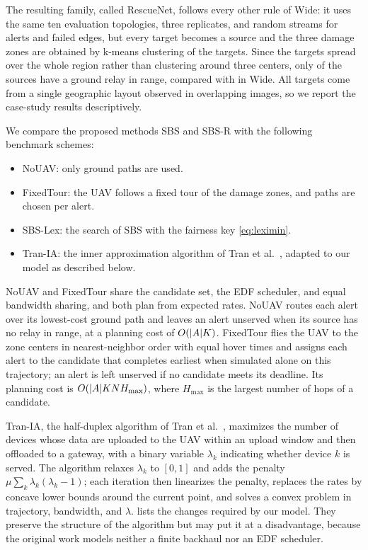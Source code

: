 The resulting family, called RescueNet, follows every other rule of Wide: it uses the same ten evaluation topologies, three replicates, and random streams for alerts and failed edges, but every target becomes a source and the three damage zones are obtained by k-means clustering of the targets. Since the targets spread over the whole region rather than clustering around three centers, only \ResultExtGroundFractionRescuenet{} of the sources have a ground relay in range, compared with \ResultExtGroundFractionVzero{} in Wide. All targets come from a single geographic layout observed in overlapping images, so we report the case-study results descriptively.

\label{sec:baselines}
We compare the proposed methods SBS and SBS-R with the following benchmark schemes:
\begin{itemize}
\item NoUAV: only ground paths are used.
\item FixedTour: the UAV follows a fixed tour of the damage zones, and paths are chosen per alert.
\item SBS-Lex: the search of SBS with the fairness key \eqref{eq:leximin}.
\item Tran-IA: the inner approximation algorithm of Tran et al.~\cite{tran2022relay}, adapted to our model as described below.
\end{itemize}
NoUAV and FixedTour share the candidate set, the EDF scheduler, and equal bandwidth sharing, and both plan from expected rates. NoUAV routes each alert over its lowest-cost ground path and leaves an alert unserved when its source has no relay in range, at a planning cost of $O(\lvert A\rvert K)$. FixedTour flies the UAV to the zone centers in nearest-neighbor order with equal hover times and assigns each alert to the candidate that completes earliest when simulated alone on this trajectory; an alert is left unserved if no candidate meets its deadline. Its planning cost is $O(\lvert A\rvert KNH_{\max})$, where $H_{\max}$ is the largest number of hops of a candidate.

\label{sec:tran}
Tran-IA, the half-duplex algorithm of Tran et al.~\cite{tran2022relay}, maximizes the number of devices whose data are uploaded to the UAV within an upload window and then offloaded to a gateway, with a binary variable $\lambda_k$ indicating whether device $k$ is served. The algorithm relaxes $\lambda_k$ to $[0,1]$ and adds the penalty $\mu\sum_k\lambda_k(\lambda_k-1)$; each iteration then linearizes the penalty, replaces the rates by concave lower bounds around the current point, and solves a convex problem in trajectory, bandwidth, and $\lambda$.  lists the changes required by our model. They preserve the structure of the algorithm but may put it at a disadvantage, because the original work models neither a finite backhaul nor an EDF scheduler.

